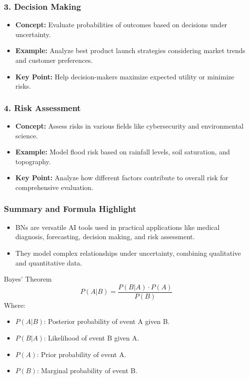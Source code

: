 \documentclass[aspectratio=169]{beamer}
\begin{document}
\begin{frame}[fragile]
    \frametitle{3. Decision Making}
    \begin{itemize}
        \item \textbf{Concept:} Evaluate probabilities of outcomes based on decisions under uncertainty.
        \item \textbf{Example:} Analyze best product launch strategies considering market trends and customer preferences.
        \item \textbf{Key Point:} Help decision-makers maximize expected utility or minimize risks.
    \end{itemize}
\end{frame}

\begin{frame}[fragile]
    \frametitle{4. Risk Assessment}
    \begin{itemize}
        \item \textbf{Concept:} Assess risks in various fields like cybersecurity and environmental science.
        \item \textbf{Example:} Model flood risk based on rainfall levels, soil saturation, and topography.
        \item \textbf{Key Point:} Analyze how different factors contribute to overall risk for comprehensive evaluation.
    \end{itemize}
\end{frame}

\begin{frame}[fragile]
    \frametitle{Summary and Formula Highlight}
    \begin{itemize}
        \item BNs are versatile AI tools used in practical applications like medical diagnosis, forecasting, decision making, and risk assessment.
        \item They model complex relationships under uncertainty, combining qualitative and quantitative data.
    \end{itemize}
    
    \begin{block}{Bayes' Theorem}
        \begin{equation}
        P(A | B) = \frac{P(B | A) \cdot P(A)}{P(B)}
        \end{equation}
        Where:
        \begin{itemize}
            \item \( P(A | B) \): Posterior probability of event A given B.
            \item \( P(B | A) \): Likelihood of event B given A.
            \item \( P(A) \): Prior probability of event A.
            \item \( P(B) \): Marginal probability of event B.
        \end{itemize}
    \end{block}
\end{frame}
\end{document}
